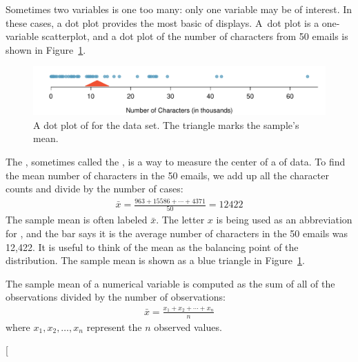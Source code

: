 Sometimes two variables is one too many: only one variable may be of interest. In these cases, a dot plot provides the most basic of displays. A~dot plot is a one-variable scatterplot, and a dot plot of the number of characters from 50 emails is shown in Figure~\ref{emailCharactersDotPlot}.
\begin{figure}[h]
   \centering
   \includegraphics[width=\textwidth]{01/figures/emailCharactersDotPlot/emailCharactersDotPlot} %
   \caption{A dot plot of  for the  data set. The triangle marks the sample's mean.}
   \label{emailCharactersDotPlot} %
\end{figure}

The , sometimes called the , is a way to measure the center of a  of data. To find the mean number of characters in the 50 emails, we add up all the character counts and divide by the number of cases:
\begin{eqnarray}
\bar{x} = \frac{963 + 15586 + \cdots + 4371}{50} = 12422
\label{sampleMeanEquation}
\end{eqnarray}
The sample mean is often labeled $\bar{x}$. The letter $x$ is being used as an abbreviation for , and the bar says it is the average number of characters in the 50 emails was 12,422. It is useful to think of the mean as the balancing point of the distribution. The sample mean is shown as a blue triangle in Figure~\ref{emailCharactersDotPlot}.

\begin{termBox}{
The sample mean of a numerical variable is computed as the sum of all of the observations divided by the number of observations:
\begin{eqnarray}
\bar{x} = \frac{x_1+x_2+\cdots+x_n}{n}
\label{meanEquation}
\end{eqnarray}
where $x_1, x_2, \dots, x_n$ represent the $n$ observed values.}
\end{termBox}\marginpar[\raggedright\vspace{-8mm}

